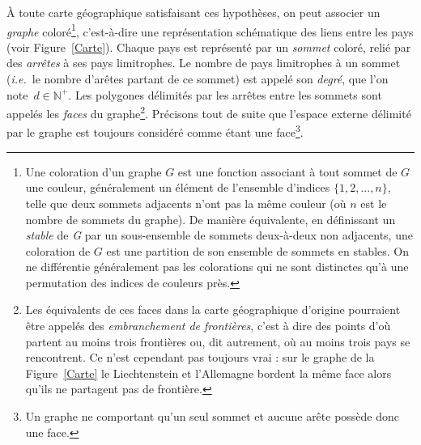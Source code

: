 \documentclass[french]{report}
\begin{document}
À toute carte géographique satisfaisant ces hypothèses, on peut associer un \textit{graphe} coloré\footnote{Une coloration d'un graphe $G$ est une fonction associant à tout sommet de $G$ une couleur, généralement un élément de l'ensemble d'indices $\{1, 2, ..., n\}$, telle que deux sommets adjacents n'ont pas la même couleur (où $n$ est le nombre de sommets du graphe). De manière équivalente, en définissant un \textit{stable} de \textit{G} par un sous-ensemble de sommets deux-à-deux non adjacents, une coloration de $G$ est une partition de son ensemble de sommets en stables. On ne différentie généralement pas les colorations qui ne sont distinctes qu'à une permutation des indices de couleurs près.}, c'est-à-dire une représentation schématique des liens entre les pays (voir Figure~\ref{Carte}). Chaque pays est représenté par un \textit{sommet} coloré, relié par des \textit{arrêtes} à ses pays limitrophes. Le nombre de pays limitrophes à un sommet (\textit{i.e.}~le nombre d'arêtes partant de ce sommet) est appelé son \textit{degré}, que l'on note~$d\in\mathbb{N}^+$. Les polygones délimités par les arrêtes entre les sommets sont appelés les \textit{faces} du graphe\footnote{Les équivalents de ces faces dans la carte géographique d'origine pourraient être appelés des \textit{embranchement de frontières}, c'est à dire des points d'où partent au moins trois frontières ou, dit autrement, où au moins trois pays se rencontrent. Ce n'est cependant pas toujours vrai : sur le graphe de la Figure~\ref{Carte} le Liechtenstein et l'Allemagne bordent la même face alors qu'ils ne partagent pas de frontière.}. Précisons tout de suite que l'espace externe délimité par le graphe est toujours considéré comme étant une face\footnote{Un graphe ne comportant qu'un seul sommet et aucune arête possède donc une face.}.

\begin{figure}[b!]
\end{figure}
\end{document}

